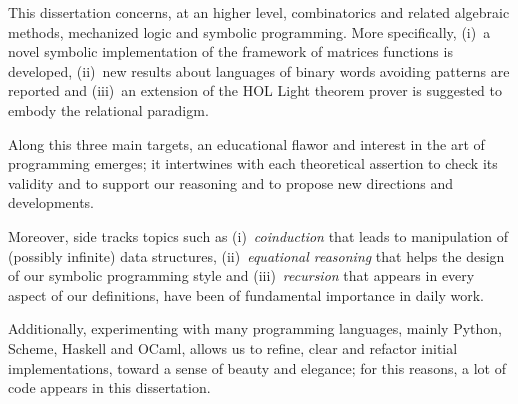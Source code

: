 
This dissertation concerns, at an higher level, combinatorics and related
algebraic methods, mechanized logic and symbolic programming.  More
specifically, (i)~a novel symbolic implementation of the framework of matrices
functions is developed, (ii)~new results about languages of binary words
avoiding patterns are reported and (iii)~an extension of the HOL Light theorem
prover is suggested to embody the relational paradigm.

Along this three main targets, an educational flawor and interest in the art of
programming emerges; it intertwines with each theoretical assertion to check
its validity and to support our reasoning and to propose new directions and
developments.

Moreover, side tracks topics such as (i)~\textit{coinduction} that leads to
manipulation of (possibly infinite) data structures, (ii)~\textit{equational
reasoning} that helps the design of our symbolic programming style and
(iii)~\textit{recursion} that appears in every aspect of our definitions, have
been of fundamental importance in daily work.

Additionally, experimenting with many programming languages, mainly Python,
Scheme, Haskell and OCaml, allows us to refine, clear and refactor initial
implementations, toward a sense of beauty and elegance; for this reasons, a lot
of code appears in this dissertation.

